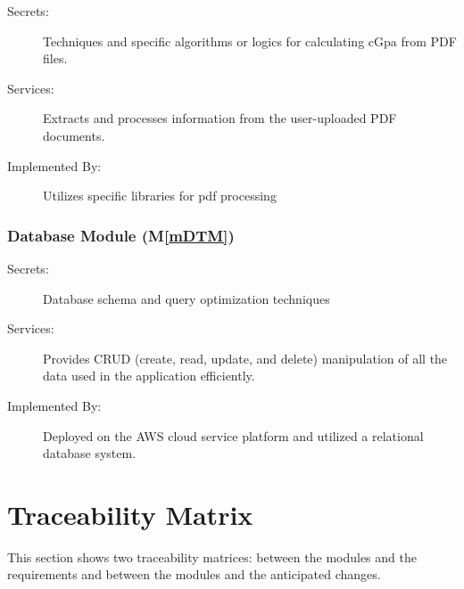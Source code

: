 \documentclass[12pt, titlepage]{article}
\newcommand{\mref}[1]{M\ref{#1}}
\begin{document}
\begin{description}
\item[Secrets:] Techniques and specific algorithms or logics for calculating cGpa from PDF files. 
\item[Services:] Extracts and processes information from the user-uploaded PDF documents.
\item[Implemented By:] Utilizes specific libraries for pdf processing
\end{description}

\subsubsection{Database Module (\mref{mDTM})}

\begin{description}
\item[Secrets:] Database schema and query optimization techniques
\item[Services:] Provides CRUD (create, read, update, and delete) manipulation of all the data used in the application efficiently. 
\item[Implemented By:] Deployed on the AWS cloud service platform and utilized a relational database system.  
\end{description}

\section{Traceability Matrix} \label{SecTM}

This section shows two traceability matrices: between the modules and the
requirements and between the modules and the anticipated changes.
\end{document}
